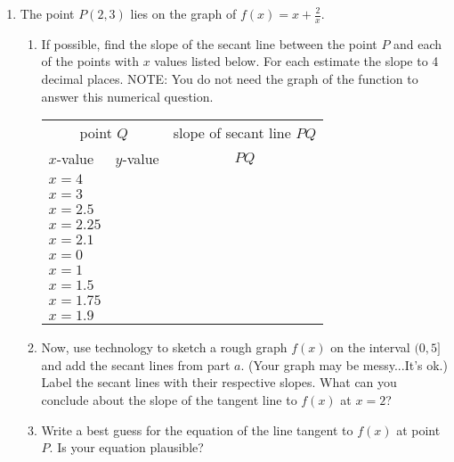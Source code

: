 \documentclass[11pt,fleqn]{article}
\begin{document}
\renewcommand{\headrulewidth}{0pt}
\newcommand{\blank}[1]{\rule{#1}{0.75pt}}
\renewcommand{\d}{\displaystyle}


\vspace*{-1in}
\begin{center}
\end{center}
\begin{enumerate}
\item The point $P(2,3)$ lies on the graph of $f(x)=x+\frac{2}{x}.$
	\begin{enumerate}
	\item If possible, find the slope of the secant line between the point $P$ and each of the points with $x$ values listed below. For each estimate the slope to 4 decimal places. NOTE: You do not need the graph of the function to answer this numerical question.\\
		{\LARGE{\begin{center}
		\begin{tabular}{l | l | c}
		\multicolumn{2}{c}{point $Q$}& slope of secant line $PQ$\\
		$x$-value&\quad$y$-value \quad \quad& $PQ$\\
		\hline
		$x=4$&&\\
		\hline
		$x=3$&&\\
		\hline
		$x=2.5$&&\\
		\hline
		$x=2.25$&&\\
		\hline
		$x=2.1$&&\\
		\hline
		$x=0$&&\\
		\hline
		$x=1$&&\\
		\hline
		$x=1.5$&&\\
		\hline
		$x=1.75$&&\\
		\hline
		$x=1.9$&&\\
		\hline
		\end{tabular}
		\end{center}}}
	\item  Now, use technology to sketch a rough graph $f(x)$ on the interval $(0,5]$ and add the secant lines from part $a$. (Your graph may be messy...It's ok.) Label the secant lines with their respective slopes. What can you conclude about the slope of the tangent line to $f(x)$ at $x=2$?
	\vfill
	\item Write a best guess for the equation of the line tangent to $f(x)$ at point $P$. Is your equation plausible?
	\vspace{.5in}
	\end{enumerate}
	\newpage


\end{enumerate}
\end{document}
